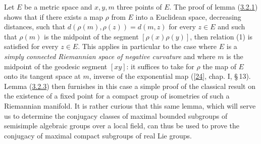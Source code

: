 \documentclass[12pt,a4paper,oneside,english]{smfart}
\makeatletter
\newcommand{\btanchor}[1]{\leavevmode\Hy@raisedlink{\hypertarget{bt:#1}{}}}
\newcommand{\btref}[1]{\hyperlink{bt:#1}{#1}}
\newcommand{\btbib}[1]{\hyperlink{bib:#1}{#1}}
\theoremstyle{definition}
\theoremstyle{bt}
\makeatother
\begin{document}
\btanchor{3.2.5}
Let $E$ be a metric space and $x,y,m$ three points of $E$. The proof of lemma
(\btref{3.2.1}) shows that if there exists a map $\rho$ from $E$ into a Euclidean
space, decreasing distances, such that $d(\rho(m),\rho(z))=d(m,z)$ for every
$z\in E$ and such that $\rho(m)$ is the midpoint of the segment
$[\rho(x)\rho(y)]$, then relation (1) is satisfied for every $z\in E$. This
applies in particular to the case where $E$ is a \emph{simply connected
Riemannian space of negative curvature} and where $m$ is the midpoint of the
geodesic segment $[xy]$: it suffices to take for $\rho$ the map of $E$ onto
its tangent space at $m$, inverse of the exponential map ([\btbib{24}], chap. I,
\S\,13). Lemma (\btref{3.2.3}) then furnishes in this case a simple proof of the
classical result on the existence of a fixed point for a compact group of
isometries of such a Riemannian manifold. It is rather curious that this same
lemma, which will serve us to determine the conjugacy classes of maximal
bounded subgroups of semisimple algebraic groups over a local field, can thus
be used to prove the conjugacy of maximal compact subgroups of real Lie
groups.
\par\endgroup
\end{document}
